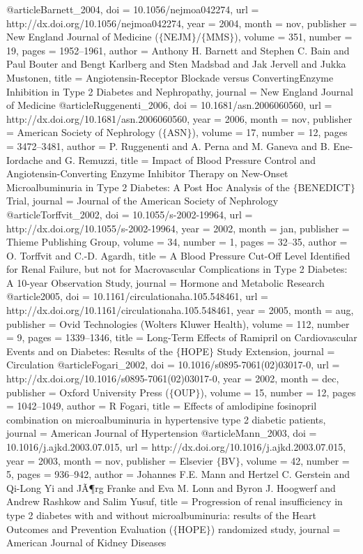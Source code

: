 @article{Barnett_2004,
	doi = {10.1056/nejmoa042274},
	url = {http://dx.doi.org/10.1056/nejmoa042274},
	year = 2004,
	month = {nov},
	publisher = {New England Journal of Medicine ($\lbrace$NEJM$\rbrace$/$\lbrace$MMS$\rbrace$)},
	volume = {351},
	number = {19},
	pages = {1952--1961},
	author = {Anthony H. Barnett and Stephen C. Bain and Paul Bouter and Bengt Karlberg and Sten Madsbad and Jak Jervell and Jukka Mustonen},
	title = {Angiotensin-Receptor Blockade versus Converting{\textendash}Enzyme Inhibition in Type 2 Diabetes and Nephropathy},
	journal = {New England Journal of Medicine}
}
@article{Ruggenenti_2006,
	doi = {10.1681/asn.2006060560},
	url = {http://dx.doi.org/10.1681/asn.2006060560},
	year = 2006,
	month = {nov},
	publisher = {American Society of Nephrology ($\lbrace$ASN$\rbrace$)},
	volume = {17},
	number = {12},
	pages = {3472--3481},
	author = {P. Ruggenenti and A. Perna and M. Ganeva and B. Ene-Iordache and G. Remuzzi},
	title = {Impact of Blood Pressure Control and Angiotensin-Converting Enzyme Inhibitor Therapy on New-Onset Microalbuminuria in Type 2 Diabetes: A Post Hoc Analysis of the $\lbrace$BENEDICT$\rbrace$ Trial},
	journal = {Journal of the American Society of Nephrology}
}
@article{Torffvit_2002,
	doi = {10.1055/s-2002-19964},
	url = {http://dx.doi.org/10.1055/s-2002-19964},
	year = 2002,
	month = {jan},
	publisher = {Thieme Publishing Group},
	volume = {34},
	number = {1},
	pages = {32--35},
	author = {O. Torffvit and C.-D. Agardh},
	title = {A Blood Pressure Cut-Off Level Identified for Renal Failure, but not for Macrovascular Complications in Type 2 Diabetes: A 10-year Observation Study},
	journal = {Hormone and Metabolic Research}
}
@article{2005,
	doi = {10.1161/circulationaha.105.548461},
	url = {http://dx.doi.org/10.1161/circulationaha.105.548461},
	year = 2005,
	month = {aug},
	publisher = {Ovid Technologies (Wolters Kluwer Health)},
	volume = {112},
	number = {9},
	pages = {1339--1346},
	title = {Long-Term Effects of Ramipril on Cardiovascular Events and on Diabetes: Results of the $\lbrace$HOPE$\rbrace$ Study Extension},
	journal = {Circulation}
}
@article{Fogari_2002,
	doi = {10.1016/s0895-7061(02)03017-0},
	url = {http://dx.doi.org/10.1016/s0895-7061(02)03017-0},
	year = 2002,
	month = {dec},
	publisher = {Oxford University Press ($\lbrace$OUP$\rbrace$)},
	volume = {15},
	number = {12},
	pages = {1042--1049},
	author = {R Fogari},
	title = {Effects of amlodipine fosinopril combination on microalbuminuria in hypertensive type 2 diabetic patients},
	journal = {American Journal of Hypertension}
}
@article{Mann_2003,
	doi = {10.1016/j.ajkd.2003.07.015},
	url = {http://dx.doi.org/10.1016/j.ajkd.2003.07.015},
	year = 2003,
	month = {nov},
	publisher = {Elsevier $\lbrace$BV$\rbrace$},
	volume = {42},
	number = {5},
	pages = {936--942},
	author = {Johannes F.E. Mann and Hertzel C. Gerstein and Qi-Long Yi and JÃ¶rg Franke and Eva M. Lonn and Byron J. Hoogwerf and Andrew Rashkow and Salim Yusuf},
	title = {Progression of renal insufficiency in type 2 diabetes with and without microalbuminuria: results of the Heart Outcomes and Prevention Evaluation ($\lbrace$HOPE$\rbrace$) randomized study},
	journal = {American Journal of Kidney Diseases}
}
